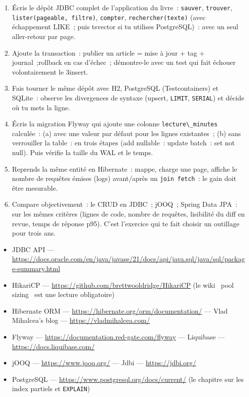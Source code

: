\begin{exercice}
\begin{enumerate}
  \item \'Ecris le d\'ep\^ot JDBC complet de l'application du livre~: \verb|sauver|, \verb|trouver|,
        \verb|lister(pageable, filtre)|, \verb|compter|, \verb|rechercher(texte)| (avec \'echappement
        LIKE~; puis tsvector si tu utilises PostgreSQL)~: avec un seul aller-retour par page.
  \item Ajoute la transaction~: publier un article = mise \`a jour + tag + journal~;rollback en cas
        d'\'echec~; d\'emontre-le avec un test qui fait \'echouer volontairement le 3\ieme insert.
  \item Fais tourner le m\^eme d\'ep\^ot avec H2, PostgreSQL (Testcontainers) et SQLite~: observe les
        divergences de syntaxe (upsert, \verb|LIMIT|, \verb|SERIAL|) et d\'ecide o\`u tu mets la ligne.
  \item \'Ecris la migration Flyway qui ajoute une colonne \verb|lecture\_minutes| calcul\'ee~: (a) avec
        une valeur par d\'efaut pour les lignes existantes~; (b) sans verrouiller la table~: en trois
        \'etapes (add nullable~: update batch~: set not null). Puis v\'erifie la taille du WAL et le temps.
  \item Reprends la m\^eme entit\'e en Hibernate~: mappe, charge une page, affiche le nombre de
        requ\^etes \'emises (logs) avant/apr\`es un \verb|join fetch|~: le gain doit \^etre mesurable.
  \item Compare objectivement~: le CRUD en JDBC~; jOOQ~; Spring Data JPA~: sur les m\^emes crit\`eres
        (lignes de code, nombre de requ\^etes, lisibilit\'e du diff en revue, temps de r\'eponse p95).
        C'est l'exercice qui te fait choisir un outillage pour trois ans.
\end{enumerate}
\end{exercice}

\begin{ressources}
\begin{itemize}
  \item JDBC API --- \url{https://docs.oracle.com/en/java/javase/21/docs/api/java.sql/java/sql/package-summary.html}
  \item HikariCP --- \url{https://github.com/brettwooldridge/HikariCP} (le wiki \og ~pool sizing~ \fg{} est une lecture obligatoire)
  \item Hibernate ORM --- \url{https://hibernate.org/orm/documentation/} --- Vlad Mihalcea's blog --- \url{https://vladmihalcea.com/}
  \item Flyway --- \url{https://documentation.red-gate.com/flyway} --- Liquibase --- \url{https://docs.liquibase.com/}
  \item jOOQ --- \url{https://www.jooq.org/} --- Jdbi --- \url{https://jdbi.org/}
  \item PostgreSQL --- \url{https://www.postgresql.org/docs/current/} (le chapitre sur les index partiels et \verb|EXPLAIN|)
\end{itemize}
\end{ressources}

